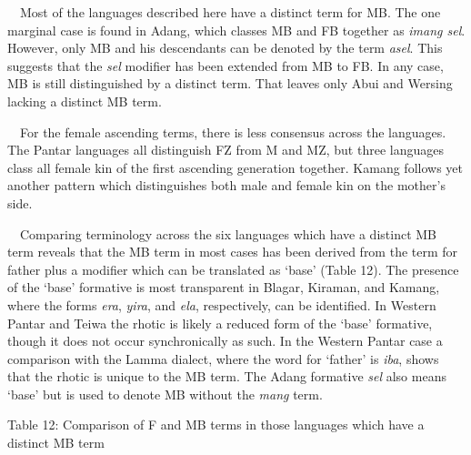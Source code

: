 \ \ Most of the languages described here have a distinct term for MB. The one marginal case is found in Adang, which classes MB and FB together as \textit{imang sel}. However, only MB and his descendants can be denoted by the term \textit{asel}. This suggests that the \textit{sel} modifier has been extended from MB to FB. In any case, MB is still distinguished by a distinct term. That leaves only Abui and Wersing lacking a distinct MB term. 

\ \ For the female ascending terms, there is less consensus across the languages. The Pantar languages all distinguish FZ from M and MZ, but three languages class all female kin of the first ascending generation together. Kamang follows yet another pattern which distinguishes both male and female kin on the mother{\textquoteright}s side.

\ \ Comparing terminology across the six languages which have a distinct MB term reveals that the MB term in most cases has been derived from the term for father plus a modifier which can be translated as {\textquoteleft}base{\textquoteright} (Table 12). The presence of the {\textquoteleft}base{\textquoteright} formative is most transparent in Blagar, Kiraman, and Kamang, where the forms \textit{era}, \textit{yira}, and \textit{ela}, respectively, can be identified. In Western Pantar and Teiwa the rhotic is likely a reduced form of the {\textquoteleft}base{\textquoteright} formative, though it does not occur synchronically as such. In the Western Pantar case a comparison with the Lamma dialect, where the word for {\textquoteleft}father{\textquoteright} is \textit{iba}, shows that the rhotic is unique to the MB term. The Adang formative \textit{sel} also means {\textquoteleft}base{\textquoteright} but is used to denote MB without the \textit{mang }term.

{\centering
Table 12: Comparison of F and MB terms in those languages which have a distinct MB term
\par}

